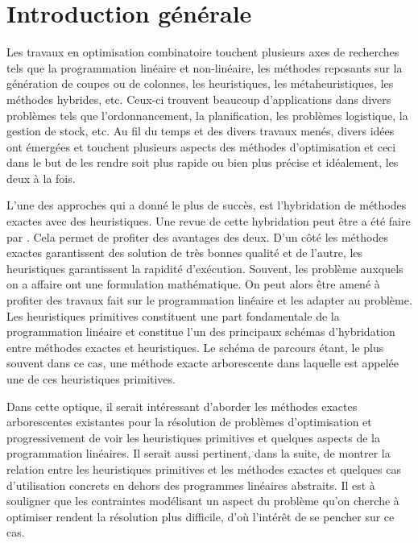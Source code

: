 \documentclass[12pt,a4paper,oneside]{book}
\theoremstyle{definition}
\begin{document}
    

    \listofalgorithms
    \listoffigures
    \tableofcontents
    \newpage
    \chapter*{Introduction générale}
    Les travaux en optimisation combinatoire touchent plusieurs axes de recherches tels que la programmation linéaire et non-linéaire, les méthodes reposants sur la génération de coupes ou de colonnes, les heuristiques, les métaheuristiques, les méthodes hybrides, etc. Ceux-ci trouvent beaucoup d'applications dans divers problèmes tels que l'ordonnancement, la planification, les problèmes logistique, la gestion de stock, etc. Au fil du temps et des divers travaux menés, divers idées ont émergées et touchent plusieurs aspects des méthodes d'optimisation et ceci dans le but de les rendre soit plus rapide ou bien plus précise et idéalement, les deux à la fois.
    
    L'une des approches qui a donné le plus de succès, est l'hybridation de méthodes exactes avec des heuristiques. Une revue de cette hybridation peut être a été faire par \cite{Puchinger2005}. Cela permet de profiter des avantages des deux. D'un côté les méthodes exactes garantissent des solution de très bonnes qualité et de l'autre, les heuristiques garantissent la rapidité d'exécution. Souvent, les problème auxquels on a affaire ont une formulation mathématique. On peut alors être amené à profiter des travaux fait sur le programmation linéaire et les adapter au problème. Les heuristiques primitives constituent une part fondamentale de la programmation linéaire et constitue l'un des principaux schémas d'hybridation entre méthodes exactes et heuristiques. Le schéma de parcours étant, le plus souvent dans ce cas, une méthode exacte arborescente dans laquelle est appelée une de ces heuristiques primitives.
    
    Dans cette optique, il serait intéressant d'aborder les méthodes exactes arborescentes existantes pour la résolution de problèmes d'optimisation et progressivement de voir les heuristiques primitives et quelques aspects de la programmation linéaires. Il serait aussi pertinent, dans la suite, de montrer la relation entre les heuristiques primitives et les méthodes exactes et quelques cas d'utilisation concrets en dehors des programmes linéaires abstraits. Il est à souligner que les contraintes modélisant un aspect du problème qu'on cherche à optimiser  rendent la résolution plus difficile, d'où l'intérêt de se pencher sur ce cas. 
    
\end{document}

